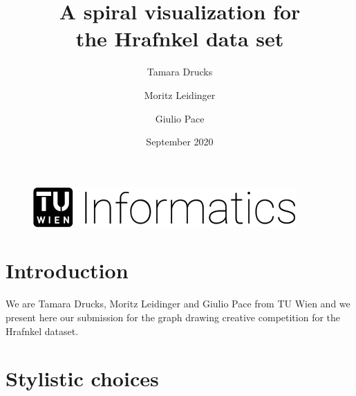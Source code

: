\documentclass[runningheads]{llncs}
\begin{document}
%
\title{A spiral visualization for \\the Hrafnkel data set}
%
%
\author{Tamara Drucks \and 
Moritz Leidinger \and 
Giulio Pace}
%




%
%
\date{September 2020}
\maketitle              %
\vspace{-35pt}
\begin{figure}
	\centering
	\includegraphics[width=.3\textwidth]{logo.png}
\end{figure}
\vspace{-25pt}
\section{Introduction}

We are Tamara Drucks, Moritz Leidinger and Giulio Pace from TU Wien and we present here our submission for the graph drawing creative competition for the Hrafnkel dataset.


\section{Stylistic choices}
\end{document}
